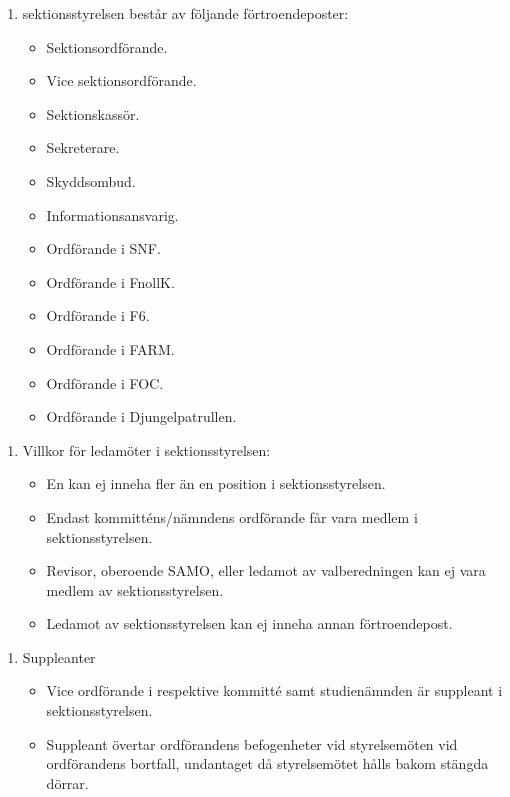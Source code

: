 \documentclass[11pt,a4paper]{article}
\begin{document}
\begin{enumerate}[\thesubsection .1]

  \item sektionsstyrelsen består av följande förtroendeposter:
    \begin{itemize}
      \item Sektionsordförande.
      \item Vice sektionsordförande.
      \item Sektionskassör.
      \item Sekreterare.
      \item Skyddsombud.
      \item Informationsansvarig.
      \item Ordförande i SNF.
      \item Ordförande i FnollK.
      \item Ordförande i F6.
      \item Ordförande i FARM.
      \item Ordförande i FOC.
      \item Ordförande i Djungelpatrullen.
    \end{itemize}

\end{enumerate}

\begin{enumerate}[\thesubsection .2]
\item Villkor för ledamöter i sektionsstyrelsen:

\begin{itemize}
\item En kan ej inneha fler än en position i sektionsstyrelsen.
\item Endast kommitténs/nämndens ordförande får vara medlem i sektionsstyrelsen.
\item Revisor, oberoende SAMO, eller ledamot av valberedningen kan ej vara medlem av sektionsstyrelsen.
\item Ledamot av sektionsstyrelsen kan ej inneha annan förtroendepost.
\end{itemize}

\end{enumerate}

\begin{enumerate}[\thesubsection .3]
\item Suppleanter
\begin{itemize}
\item Vice ordförande i respektive kommitté samt studienämnden är suppleant i sektionsstyrelsen.
\item Suppleant övertar ordförandens befogenheter vid styrelsemöten vid ordförandens bortfall, undantaget då styrelsemötet hålls bakom stängda dörrar.
\end{itemize}
\end{enumerate}
\end{document}
